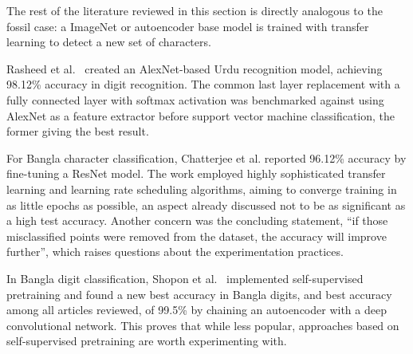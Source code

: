 \documentclass[english,twoside,openright]{UH_DS_MSc}
\begin{document}
The rest of the literature reviewed in this section is directly analogous 
to the fossil case: a ImageNet or autoencoder base model is trained with transfer learning to detect a new set of characters.



Rasheed et al.~\cite{5rasheedHandwrittenUrduWAlexNet} created an AlexNet-based Urdu recognition 
model, achieving 98.12\% accuracy in digit recognition. The common last layer replacement 
with a fully connected layer with softmax activation was benchmarked against using AlexNet as 
a feature extractor before support vector 
machine classification, the former giving the best result.



For Bangla character classification, Chatterjee et al. reported 96.12\% accuracy 
by fine-tuning a ResNet model. The work employed highly sophisticated transfer
 learning and learning rate scheduling algorithms, aiming to converge training in as 
 little epochs as possible, an aspect already discussed not to be as significant as a high test accuracy.
  Another concern was the concluding statement, ``if those misclassified points were 
  removed from the dataset, the accuracy will improve further'', which raises questions about the experimentation practices.



In Bangla digit classification, Shopon et al.~\cite{6shoponBangla} implemented self-supervised 
pretraining and found a new best accuracy in Bangla digits,
and best accuracy among all articles reviewed, of 99.5\% by chaining an autoencoder
with a deep convolutional network. This proves that while less popular, approaches based on self-supervised pretraining  are worth experimenting with.
\end{document}
